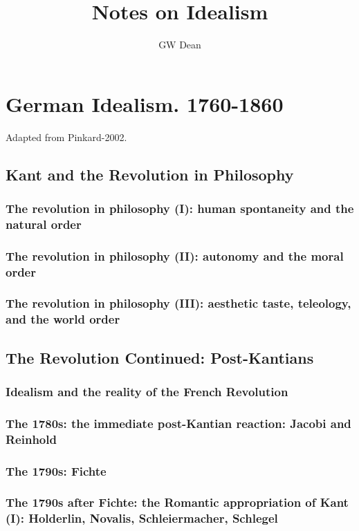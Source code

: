 \documentclass[11pt]{article} %
\title{Notes on Idealism}
\author{GW Dean}
\begin{document}
\maketitle

\section{German Idealism. 1760-1860}
Adapted from Pinkard-2002.

\subsection{Kant and the Revolution in Philosophy}
\subsubsection{The revolution in philosophy (I): human spontaneity and the natural order}
\subsubsection{The revolution in philosophy (II): autonomy and the moral order}
\subsubsection{The revolution in philosophy (III): aesthetic taste, teleology, and the world order}
\subsection{The Revolution Continued: Post-Kantians}
\subsubsection{Idealism and the reality of the French Revolution}
\subsubsection{The 1780s: the immediate post-Kantian reaction: Jacobi and Reinhold}
\subsubsection{The 1790s: Fichte}
\subsubsection{The 1790s after Fichte: the Romantic appropriation of Kant (I): Holderlin, Novalis, Schleiermacher, Schlegel}
\end{document}
